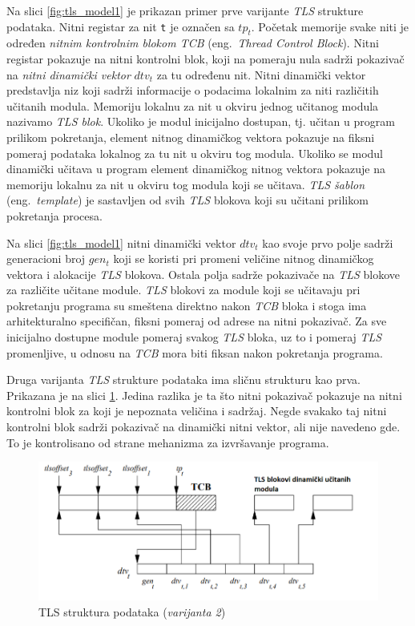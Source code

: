 \documentclass[12pt,oneside]{memoir}
\begin{document}
Na slici \ref{fig:tls_model1} je prikazan primer prve varijante \emph{TLS} strukture podataka. Nitni registar za nit \texttt{t} je označen sa \texttt{$tp_t$}. Početak  memorije svake niti je određen \emph{nitnim kontrolnim blokom \emph{TCB}} (eng.~\emph{Thread Control Block}). Nitni registar pokazuje na nitni kontrolni blok, koji na pomeraju nula sadrži pokazivač na \emph{nitni dinamički vektor} \texttt{$dtv_t$} za tu određenu nit. Nitni dinamički vektor predstavlja niz koji sadrži informacije o podacima lokalnim za niti različitih učitanih modula. Memoriju lokalnu za nit u okviru jednog učitanog modula nazivamo \emph{TLS blok}. Ukoliko je modul inicijalno dostupan, tj. učitan u program prilikom pokretanja, element nitnog dinamičkog vektora pokazuje na fiksni pomeraj podataka lokalnog za tu nit u okviru tog modula. Ukoliko se modul dinamički učitava u program element dinamičkog nitnog vektora pokazuje na memoriju lokalnu za nit u okviru tog modula koji se učitava. \emph{TLS šablon} (eng.~\emph{template}) je sastavljen od svih \emph{TLS} blokova koji su učitani prilikom pokretanja procesa.

Na slici \ref{fig:tls_model1} nitni dinamički vektor \texttt{$dtv_t$} kao svoje prvo polje sadrži generacioni broj \texttt{$gen_t$} koji se koristi pri promeni veličine nitnog dinamičkog vektora i alokacije \emph{TLS} blokova. Ostala polja sadrže pokazivače na \emph{TLS} blokove za različite učitane module. \emph{TLS} blokovi za module koji se učitavaju pri pokretanju programa su smeštena direktno nakon \emph{TCB} bloka i stoga ima arhitekturalno specifičan, fiksni pomeraj od adrese na nitni pokazivač. Za sve inicijalno dostupne module pomeraj svakog \emph{TLS} bloka, uz to i pomeraj \emph{TLS} promenljive, u odnosu na \emph{TCB} mora biti fiksan nakon pokretanja programa.

Druga varijanta \emph{TLS} strukture podataka ima sličnu strukturu kao prva. Prikazana je na slici \ref{fig:tls_model2}. Jedina razlika je ta što nitni pokazivač pokazuje na nitni kontrolni blok za koji je nepoznata veličina i sadržaj. Negde svakako taj nitni kontrolni blok sadrži pokazivač na dinamički nitni vektor, ali nije navedeno gde. To je kontrolisano od strane mehanizma za izvršavanje programa.

\begin{figure}[h!]
	\begin{center}
		\includegraphics[scale=0.6]{slike/TLSmodelV2.png}
	\end{center}
	\caption{TLS struktura podataka (\emph{varijanta 2})}
	\label{fig:tls_model2}
\end{figure}
\end{document}
